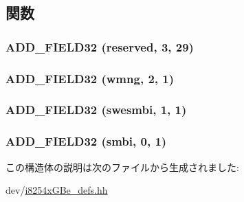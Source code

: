 \subsection{関数}
\hypertarget{structiGbReg_1_1Regs_1_1SWSM_aa8b8c0949aff16c9275a901c9d66476b}{
\subsubsection[{ADD\_\-FIELD32}]{\setlength{\rightskip}{0pt plus 5cm}ADD\_\-FIELD32 (reserved, \/  3, \/  29)}}
\label{structiGbReg_1_1Regs_1_1SWSM_aa8b8c0949aff16c9275a901c9d66476b}
\hypertarget{structiGbReg_1_1Regs_1_1SWSM_a7cde12c6e9acfc4ba5315ae6b865db08}{
\subsubsection[{ADD\_\-FIELD32}]{\setlength{\rightskip}{0pt plus 5cm}ADD\_\-FIELD32 (wmng, \/  2, \/  1)}}
\label{structiGbReg_1_1Regs_1_1SWSM_a7cde12c6e9acfc4ba5315ae6b865db08}
\hypertarget{structiGbReg_1_1Regs_1_1SWSM_ab69e67b64f141c346829140260eb652f}{
\subsubsection[{ADD\_\-FIELD32}]{\setlength{\rightskip}{0pt plus 5cm}ADD\_\-FIELD32 (swesmbi, \/  1, \/  1)}}
\label{structiGbReg_1_1Regs_1_1SWSM_ab69e67b64f141c346829140260eb652f}
\hypertarget{structiGbReg_1_1Regs_1_1SWSM_a94db8551b46f0f26933222471c278153}{
\subsubsection[{ADD\_\-FIELD32}]{\setlength{\rightskip}{0pt plus 5cm}ADD\_\-FIELD32 (smbi, \/  0, \/  1)}}
\label{structiGbReg_1_1Regs_1_1SWSM_a94db8551b46f0f26933222471c278153}


この構造体の説明は次のファイルから生成されました:\begin{DoxyCompactItemize}
\item 
dev/\hyperlink{i8254xGBe__defs_8hh}{i8254xGBe\_\-defs.hh}\end{DoxyCompactItemize}
